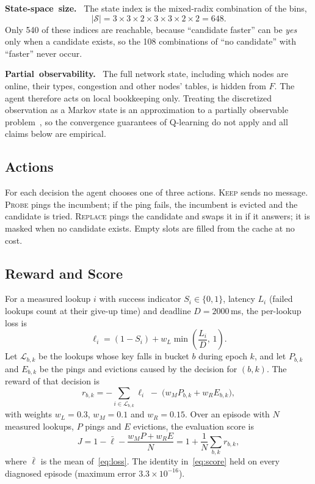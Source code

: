 \documentclass[9pt,twocolumn]{extarticle}
\newcommand{\inl}[1]{\mbox{\textbf{#1.}}\ }
\newcommand{\act}[1]{\textsc{#1}}
\newcommand{\Lset}{\mathcal{L}}
\begin{document}
\inl{State-space size} The state index is the mixed-radix combination of the bins,
\begin{equation}
|\mathcal{S}| = 3 \times 3 \times 2 \times 3 \times 3 \times 2 \times 2 = 648 .
\label{eq:states}
\end{equation}
Only 540 of these indices are reachable, because ``candidate faster'' can be \emph{yes} only when a candidate exists, so the 108 combinations of ``no candidate'' with ``faster'' never occur.

\inl{Partial observability} The full network state, including which nodes are online, their types, congestion and other nodes' tables, is hidden from $F$. The agent therefore acts on local bookkeeping only. Treating the discretized observation as a Markov state is an approximation to a partially observable problem~\cite{kaelbling}, so the convergence guarantees of Q-learning do not apply and all claims below are empirical.

\subsection{Actions}
For each decision the agent chooses one of three actions. \act{Keep} sends no message. \act{Probe} pings the incumbent; if the ping fails, the incumbent is evicted and the candidate is tried. \act{Replace} pings the candidate and swaps it in if it answers; it is masked when no candidate exists. Empty slots are filled from the cache at no cost.

\subsection{Reward and Score}
For a measured lookup $i$ with success indicator $S_i\in\{0,1\}$, latency $L_i$ (failed lookups count at their give-up time) and deadline $D=2000$\,ms, the per-lookup loss is
\begin{equation}
\ell_i = (1 - S_i) + w_L \min\!\left(\frac{L_i}{D},\, 1\right).
\label{eq:loss}
\end{equation}
Let $\Lset_{b,k}$ be the lookups whose key falls in bucket $b$ during epoch $k$, and let $P_{b,k}$ and $E_{b,k}$ be the pings and evictions caused by the decision for $(b,k)$. The reward of that decision is
\begin{equation}
r_{b,k} = -\sum_{i\in\Lset_{b,k}} \ell_i \;-\; \bigl(w_M P_{b,k} + w_R E_{b,k}\bigr),
\label{eq:reward}
\end{equation}
with weights $w_L=0.3$, $w_M=0.1$ and $w_R=0.15$. Over an episode with $N$ measured lookups, $P$ pings and $E$ evictions, the evaluation score is
\begin{equation}
J = 1 - \bar{\ell} - \frac{w_M P + w_R E}{N} = 1 + \frac{1}{N}\sum_{b,k} r_{b,k},
\label{eq:score}
\end{equation}
where $\bar{\ell}$ is the mean of~\eqref{eq:loss}. The identity in~\eqref{eq:score} held on every diagnosed episode (maximum error $3.3\times10^{-16}$).
\end{document}
